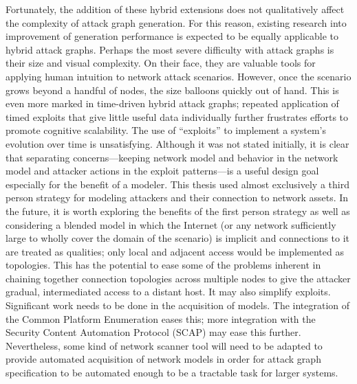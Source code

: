 Fortunately, the addition of these hybrid extensions does not qualitatively
affect the complexity of attack graph generation. For this reason, existing
research into improvement of generation performance is expected to be
equally applicable to hybrid attack graphs.
Perhaps the most severe difficulty with attack graphs is their size and visual
complexity. On their face, they are valuable tools for applying human intuition
to network attack scenarios. However, once the scenario grows beyond a handful
of nodes, the size balloons quickly out of hand. This is even more marked in
time-driven hybrid attack graphs; repeated application of timed exploits that
give little useful data individually further frustrates efforts to promote
cognitive scalability.
The use of ``exploits'' to implement a system's evolution over time is
unsatisfying. Although it was not stated initially, it is
clear that separating concerns---keeping network model and behavior in the
network model and attacker actions in the exploit patterns---is a useful
design goal especially for the benefit of a modeler.
This thesis used almost exclusively a third person strategy for modeling
attackers and their connection to network assets. In the future, it is worth
exploring the benefits of the first person strategy as well as considering a
blended model in which the Internet (or any network sufficiently large to
wholly cover the domain of the scenario) is implicit and connections to it are
treated as qualities; only local and adjacent access would be implemented as
topologies. This has the potential to ease some of the problems inherent in
chaining together connection topologies across multiple nodes to give the
attacker gradual, intermediated access to a distant host. It may also simplify
exploits.
Significant work needs to be done in the acquisition of models. The integration
of the Common Platform Enumeration eases this; more integration with the
Security Content Automation Protocol (SCAP) may ease this further. %
Nevertheless, some kind of network scanner tool will need to be adapted to
provide automated acquisition of network models in order for attack graph
specification to be automated enough to be a tractable task for larger systems.

